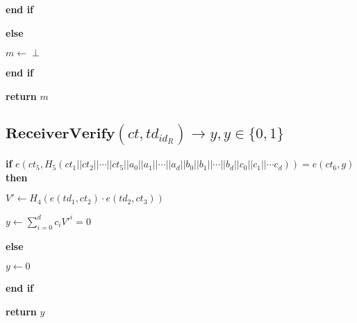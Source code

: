 \documentclass[a4paper]{article}
\begin{document}
\quad\textbf{end if}

\textbf{else}

	\quad$m \gets \perp$

\textbf{end if}

\textbf{return} $m$

\subsection{$\textbf{ReceiverVerify}(\textit{ct}, \textit{td}_{\textit{id}_R}) \rightarrow y, y \in \{0, 1\}$}

\textbf{if} $e(\textit{ct}_5, H_5(\textit{ct}_1 || \textit{ct}_2 || \cdots || \textit{ct}_5 || a_0 || a_1 || \cdots || a_d || b_0 || b_1 || \cdots || b_d || c_0 || c_1 || \cdots c_d)) = e(\textit{ct}_6, g)$ \textbf{then}

	\quad$V' \gets H_4(e(\textit{td}_1, \textit{ct}_2) \cdot e(\textit{td}_2, \textit{ct}_3))$

	\quad$y \gets \sum\limits_{i = 0}^d c_i V'^i = 0$

\textbf{else}

	\quad$y \gets 0$

\textbf{end if}

\textbf{return} $y$
\end{document}

